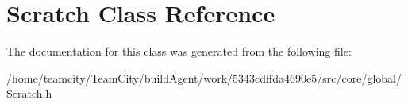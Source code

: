 \hypertarget{classScratch}{}\section{Scratch Class Reference}
\label{classScratch}


The documentation for this class was generated from the following file\+:\begin{DoxyCompactItemize}
\item 
/home/teamcity/\+Team\+City/build\+Agent/work/5343cdffda4690e5/src/core/global/Scratch.\+h\end{DoxyCompactItemize}
